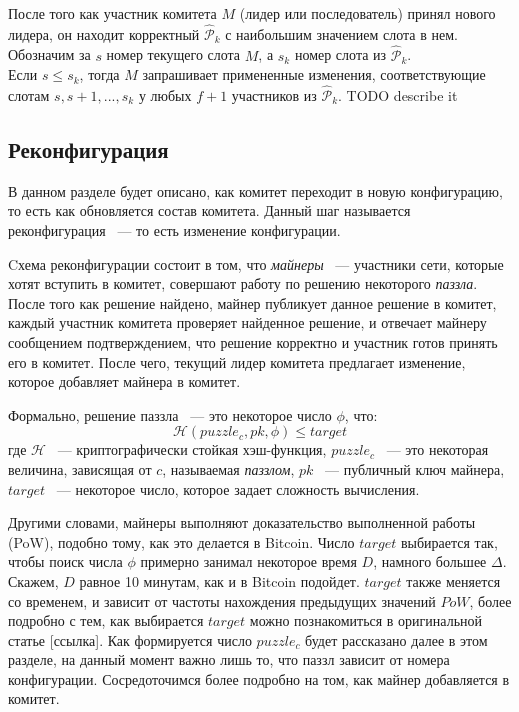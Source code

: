 После того как участник комитета $M$ (лидер или последователь) принял нового лидера, он находит корректный $\hat{\mathcal{P}}_k$ с наибольшим значением слота в нем. Обозначим за $s$ номер текущего слота $M$, а $s_k$ номер слота из $\hat{\mathcal{P}}_k$.\\
Если $s \le s_k$, тогда $M$ запрашивает примененные изменения, соответствующие слотам $s, s+1,..., s_k$ у любых $f+1$ участников из $\hat{\mathcal{P}}_k$.
TODO describe it

\subsection{Реконфигурация}
В данном разделе будет описано, как комитет переходит в новую конфигурацию, то есть как обновляется состав комитета. Данный шаг называется реконфигурация ~--- то есть изменение конфигурации.

Cхема реконфигурации состоит в том, что \textit{майнеры} ~--- участники сети, которые хотят вступить в комитет, совершают работу по решению некоторого \textit{паззла}. После того как решение найдено, майнер публикует данное решение в комитет, каждый участник комитета проверяет найденное решение, и отвечает майнеру сообщением подтверждением, что решение корректно и участник готов принять его в комитет.
После чего, текущий лидер комитета предлагает изменение, которое добавляет майнера в комитет.

Формально, решение паззла ~--- это некоторое число $\phi$, что:
$$\mathcal{H}(puzzle_c, pk, \phi) \le target$$
где $\mathcal{H}$ ~--- криптографически стойкая хэш-функция, $puzzle_c$ ~--- это некоторая величина, зависящая от $c$, называемая \textit{паззлом}, $pk$ ~--- публичный ключ майнера, $target$ ~--- некоторое число, которое задает сложность вычисления.

Другими словами, майнеры выполняют доказательство выполненной работы (PoW), подобно тому, как это делается в Bitcoin.  Число $target$ выбирается так, чтобы поиск числа $\phi$ примерно занимал некоторое время $D$, намного большее $\Delta$. Скажем, $D$ равное 10 минутам, как и в Bitcoin подойдет.  $target$ также меняется со временем, и зависит от частоты нахождения предыдущих значений $PoW$, более подробно с тем, как выбирается $target$ можно познакомиться в оригинальной статье [ссылка].
Как формируется число $puzzle_c$ будет рассказано далее в этом разделе, на данный момент важно лишь то, что паззл зависит от номера конфигурации. Сосредоточимся более подробно на том, как майнер добавляется в комитет.

